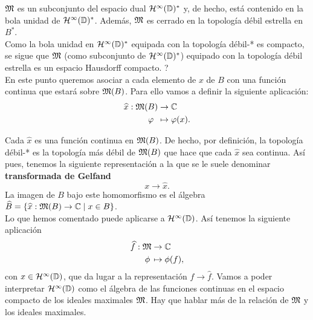 $\mathfrak{M}$ es un subconjunto del espacio dual $\mathcal{H}^{\infty}(\mathbb{D})^*$ y, de hecho, está contenido en la bola unidad de $\mathcal{H}^{\infty}(\mathbb{D})^*$. Además, $\mathfrak{M}$ es cerrado en la topología débil estrella en $B^*$. \\

Como la bola unidad en $\mathcal{H}^{\infty}(\mathbb{D})^*$ equipada con la topología débil-* es compacto, se sigue que $\mathfrak{M}$ (como subconjunto de $\mathcal{H}^{\infty}(\mathbb{D})^*$) equipado con la topología débil estrella es un espacio Hausdorff compacto. ? \\

En este punto queremos asociar a cada elemento de $x$ de $B$ con una función continua que estará sobre $\mathfrak{M}(B)$. Para ello vamos a definir la siguiente aplicación:
\begin{equation*}
    \begin{split}
        \widehat x:  \mathfrak{M}(B) & \rightarrow  \mathbb{C} \\
                 \varphi \, \, \, & \mapsto  \varphi (x).
    \end{split}
\end{equation*}

Cada $\widehat x$ es una función continua en $\mathfrak{M} (B)$. De hecho, por definición, la topología débil-* es la topología más débil de $\mathfrak{M} (B)$ que hace que cada $\widehat x$ sea continua. Así pues, tenemos la siguiente representación a la que se le suele denominar \textbf{transformada de Gelfand}
\begin{equation*}
    x \rightarrow \widehat x.
\end{equation*}
La imagen de $B$ bajo este homomorfismo es el álgebra $\widehat B = \{\widehat x: \mathfrak{M}(B) \rightarrow  \mathbb{C} \mid x \in B\}$. \\

Lo que hemos comentado puede aplicarse a $\mathcal{H}^{\infty}(\mathbb{D})$. Así tenemos la siguiente aplicación
\begin{equation*}
    \begin{split}
        \widehat f:  \mathfrak{M} & \rightarrow  \mathbb{C} \\
                \phi \, & \mapsto  \phi (f),
    \end{split}
\end{equation*}
con $x \in \mathcal{H}^{\infty}(\mathbb{D})$, que da lugar a la representación $f \rightarrow \widehat f$. Vamos a poder interpretar $\mathcal{H}^{\infty}(\mathbb{D})$ como el álgebra de las funciones continuas en el espacio compacto de los ideales maximales $\mathfrak{M}$. Hay que hablar más de la relación de $\mathfrak{M}$ y los ideales maximales. \\

